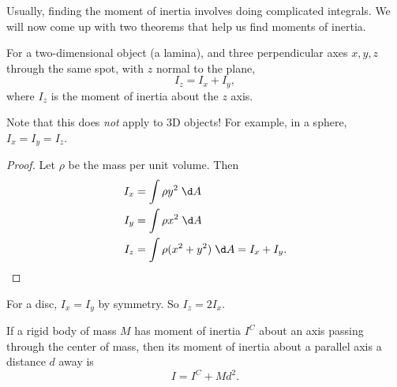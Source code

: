 \documentclass[a4paper]{article}
\begin{document}
Usually, finding the moment of inertia involves doing complicated integrals. We will now come up with two theorems that help us find moments of inertia.
\begin{thm}
  For a two-dimensional object (a lamina), and three perpendicular axes $x, y, z$ through the same spot, with $z$ normal to the plane,
  \[
    I_z = I_x + I_y,
  \]
  where $I_z$ is the moment of inertia about the $z$ axis.
  \begin{center}
  \end{center}
\end{thm}
Note that this does \emph{not} apply to 3D objects! For example, in a sphere, $I_x = I_y = I_z$.

\begin{proof}
  Let $\rho$ be the mass per unit volume. Then
  \begin{align*}
    I_x &= \int \rho y^2 \;\d A\\
    I_y &= \int \rho x^2 \;\d A\\
    I_z &= \int \rho (x^2 + y^2)\;\d A = I_x + I_y.
  \end{align*}
\end{proof}

\begin{eg}
  For a disc, $I_x = I_y$ by symmetry. So $I_z = 2 I_x$.
\end{eg}

\begin{thm}
  If a rigid body of mass $M$ has moment of inertia $I^C$ about an axis passing through the center of mass, then its moment of inertia about a parallel axis a distance $d$ away is
  \[
    I = I^C + Md^2.
  \]
  \begin{center}
  \end{center}
\end{thm}
\end{document}
